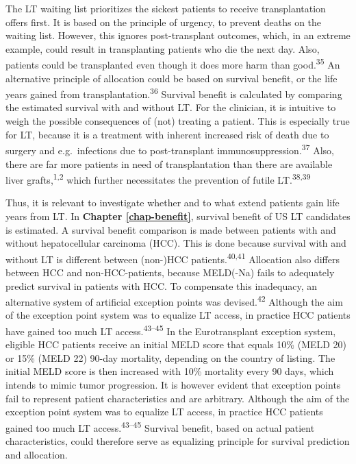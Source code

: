 \documentclass[11pt,english,]{book} %
\begin{document}
The LT waiting list prioritizes the sickest patients to receive transplantation offers first. It is based on the principle of urgency, to prevent deaths on the waiting list. However, this ignores post-transplant outcomes, which, in an extreme example, could result in transplanting patients who die the next day. Also, patients could be transplanted even though it does more harm than good.\textsuperscript{35} An alternative principle of allocation could be based on survival benefit, or the life years gained from transplantation.\textsuperscript{36} Survival benefit is calculated by comparing the estimated survival with and without LT. For the clinician, it is intuitive to weigh the possible consequences of (not) treating a patient. This is especially true for LT, because it is a treatment with inherent increased risk of death due to surgery and e.g.~infections due to post-transplant immunosuppression.\textsuperscript{37} Also, there are far more patients in need of transplantation than there are available liver grafts,\textsuperscript{1,2} which further necessitates the prevention of futile LT.\textsuperscript{38,39}

Thus, it is relevant to investigate whether and to what extend patients gain life years from LT. In \textbf{Chapter \ref{chap-benefit}}, survival benefit of US LT candidates is estimated. A survival benefit comparison is made between patients with and without hepatocellular carcinoma (HCC). This is done because survival with and without LT is different between (non-)HCC patients.\textsuperscript{40,41} Allocation also differs between HCC and non-HCC-patients, because MELD(-Na) fails to adequately predict survival in patients with HCC. To compensate this inadequacy, an alternative system of artificial exception points was devised.\textsuperscript{42} Although the aim of the exception point system was to equalize LT access, in practice HCC patients have gained too much LT access.\textsuperscript{43--45}
In the Eurotransplant exception system, eligible HCC patients receive an initial MELD score that equals 10\% (MELD 20) or 15\% (MELD 22) 90-day mortality, depending on the country of listing. The initial MELD score is then increased with 10\% mortality every 90 days, which intends to mimic tumor progression. It is however evident that exception points fail to represent patient characteristics and are arbitrary. Although the aim of the exception point system was to equalize LT access, in practice HCC patients gained too much LT access.\textsuperscript{43--45} Survival benefit, based on actual patient characteristics, could therefore serve as equalizing principle for survival prediction and allocation.
\end{document}
